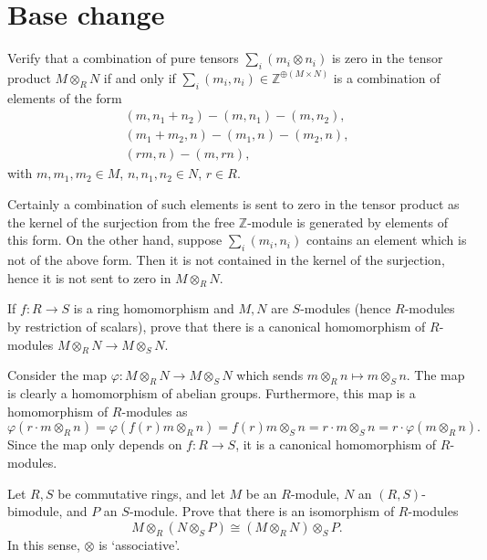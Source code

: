 \documentclass[../../master.tex]{subfiles}
\begin{document}
\section{Base change}

\begin{problem}
    Verify that a combination of pure tensors $\sum_i (m_i \otimes n_i)$ is zero in the tensor product $M \otimes_R N$ if and only if $\sum_i (m_i, n_i) \in \mathbb{Z}^{\oplus(M \times N)}$ is a combination of elements of the form
    \begin{gather*}
        (m, n_1 + n_2) - (m, n_1) - (m, n_2), \\
        (m_1 + m_2, n) - (m_1, n) - (m_2, n), \\
        (rm, n) - (m, rn),
    \end{gather*}
    with $m, m_1, m_2 \in M$, $n, n_1, n_2 \in N$, $r \in R$.
\end{problem}

\begin{solution}
    Certainly a combination of such elements is sent to zero in the tensor product as the kernel of the surjection from the free $\mathbb{Z}$-module is generated by elements of this form.
    On the other hand, suppose $\sum_i (m_i, n_i)$ contains an element which is not of the above form.
    Then it is not contained in the kernel of the surjection, hence it is not sent to zero in $M \otimes_R N$.
\end{solution}

\begin{problem}
    If $f: R \to S$ is a ring homomorphism and $M, N$ are $S$-modules (hence $R$-modules by restriction of scalars), prove that there is a canonical homomorphism of $R$-modules $M \otimes_R N \to M \otimes_S N$.
\end{problem}

\begin{solution}
    Consider the map $\varphi : M \otimes_R N \to M \otimes_S N$ which sends $m \otimes_R n \mapsto m \otimes_S n$.
    The map is clearly a homomorphism of abelian groups.
    Furthermore, this map is a homomorphism of $R$-modules as
    \[
        \varphi(r \cdot m \otimes_R n) = \varphi(f(r) m \otimes_R n) = f(r) m \otimes_S n = r \cdot m \otimes_S n = r \cdot \varphi(m \otimes_R n).
    \]
    Since the map only depends on $f: R \to S$, it is a canonical homomorphism of $R$-modules.
\end{solution}

\begin{problem}
    Let $R, S$ be commutative rings, and let $M$ be an $R$-module, $N$ an $(R, S)$-bimodule, and $P$ an $S$-module.
    Prove that there is an isomorphism of $R$-modules
    \[
        M \otimes_R (N \otimes_S P) \cong (M \otimes_R N) \otimes_S P.
    \]
    In this sense, $\otimes$ is `associative'.
\end{problem}
\end{document}
